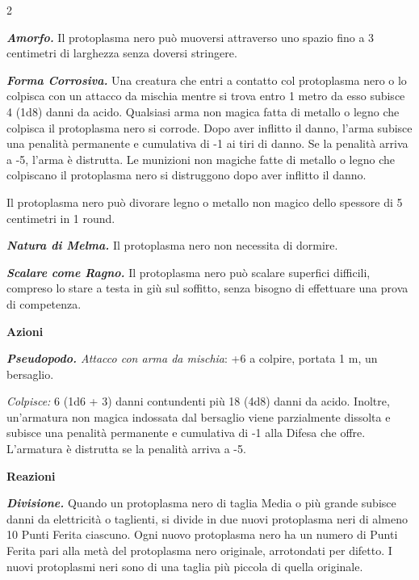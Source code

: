 \begin{multicols}{2}
{\emph{\textbf{Amorfo.}} Il protoplasma nero può muoversi attraverso uno spazio fino a 3 centimetri di larghezza senza doversi stringere.

\emph{\textbf{Forma Corrosiva.}} Una creatura che entri a contatto col protoplasma nero o lo colpisca con un attacco da mischia mentre si trova entro 1 metro da esso subisce 4 (1d8) danni da acido. Qualsiasi arma non magica fatta di metallo o legno che colpisca il protoplasma nero si corrode. Dopo aver inflitto il danno, l'arma subisce una penalità permanente e cumulativa di -1 ai tiri di danno. Se la penalità arriva a -5, l'arma è distrutta. Le munizioni non magiche fatte di metallo o legno che colpiscano il protoplasma nero si distruggono dopo aver inflitto il danno.

Il protoplasma nero può divorare legno o metallo non magico dello spessore di 5 centimetri in 1 round.

\emph{\textbf{Natura di Melma.}} Il protoplasma nero non necessita di dormire.

\emph{\textbf{Scalare come Ragno.}} Il protoplasma nero può scalare superfici difficili, compreso lo stare a testa in giù sul soffitto, senza bisogno di effettuare una prova di competenza.

\textbf{Azioni}

\emph{\textbf{Pseudopodo.} Attacco con arma da mischia}: +6 a colpire, portata 1 m, un bersaglio.

\emph{Colpisce:} 6 (1d6 + 3) danni contundenti più 18 (4d8) danni da acido. Inoltre, un'armatura non magica indossata dal bersaglio viene parzialmente dissolta e subisce una penalità permanente e cumulativa di -1 alla Difesa che offre. L'armatura è distrutta se la penalità arriva a -5.

\textbf{Reazioni}

\emph{\textbf{Divisione.}} Quando un protoplasma nero di taglia Media o più grande subisce danni da elettricità o taglienti, si divide in due nuovi protoplasma neri di almeno 10 Punti Ferita ciascuno. Ogni nuovo protoplasma nero ha un numero di Punti Ferita pari alla metà del protoplasma nero originale, arrotondati per difetto. I nuovi protoplasmi neri sono di una taglia più piccola di quella originale.

}
\end{multicols}
